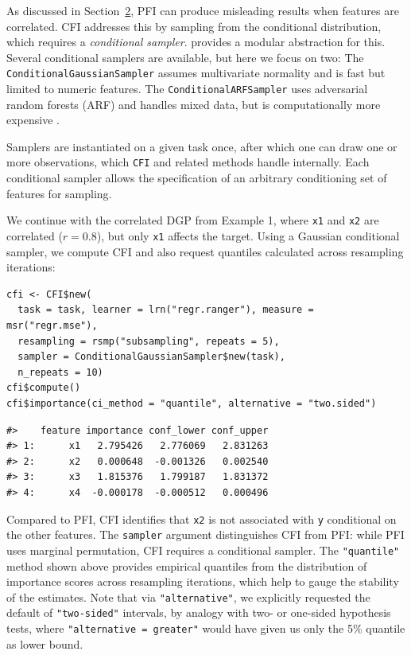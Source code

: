 As discussed in Section~\hyperref[sec-fi-methods]{2}, PFI can produce misleading results when features are correlated.
CFI addresses this by sampling from the conditional distribution, which requires a \emph{conditional sampler}.
 provides a modular abstraction for this.
Several conditional samplers are available, but here we focus on two:
The \texttt{ConditionalGaussianSampler} assumes multivariate normality and is fast but limited to numeric features.
The \texttt{ConditionalARFSampler} uses adversarial random forests (ARF) and handles mixed data, but is computationally more expensive \citep{watson2023adversarialrandom}.

Samplers are instantiated on a given task once, after which one can draw one or more observations, which \texttt{CFI} and related methods handle internally.
Each conditional sampler allows the specification of an arbitrary conditioning set of features for sampling.

We continue with the correlated DGP from Example 1, where \texttt{x1} and \texttt{x2} are correlated (\(r = 0.8\)), but only \texttt{x1} affects the target.
Using a Gaussian conditional sampler, we compute CFI and also request quantiles calculated across resampling iterations:

\begin{verbatim}
cfi <- CFI$new(
  task = task, learner = lrn("regr.ranger"), measure = msr("regr.mse"),
  resampling = rsmp("subsampling", repeats = 5),
  sampler = ConditionalGaussianSampler$new(task),
  n_repeats = 10)
cfi$compute()
cfi$importance(ci_method = "quantile", alternative = "two.sided")
\end{verbatim}

\begin{verbatim}
#>    feature importance conf_lower conf_upper
#> 1:      x1   2.795426   2.776069   2.831263
#> 2:      x2   0.000648  -0.001326   0.002540
#> 3:      x3   1.815376   1.799187   1.831372
#> 4:      x4  -0.000178  -0.000512   0.000496
\end{verbatim}

Compared to PFI, CFI identifies that \texttt{x2} is not associated with \texttt{y} conditional on the other features.
The \texttt{sampler} argument distinguishes CFI from PFI: while PFI uses marginal permutation, CFI requires a conditional sampler.
The \texttt{"quantile"} method shown above provides empirical quantiles from the distribution of importance scores across resampling iterations, which help to gauge the stability of the estimates.
Note that via \texttt{"alternative"}, we explicitly requested the default of \texttt{"two-sided"} intervals, by analogy with two- or one-sided hypothesis tests, where \texttt{"alternative\ =\ \textquotesingle{}greater\textquotesingle{}"} would have given us only the 5\% quantile as lower bound.

